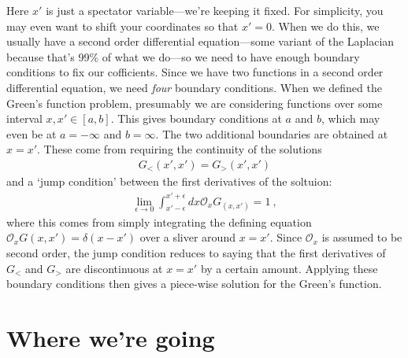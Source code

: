 Here $x'$ is just a spectator variable---we're keeping it fixed. For simplicity, you may even want to shift your coordinates so that $x'=0$. When we do this, we usually have a second order differential equation---some variant of the Laplacian because that's 99\% of what we do---so we need to have enough boundary conditions to fix our cofficients. Since we have two functions in a second order differential equation, we need \emph{four} boundary conditions. When we defined the Green's function problem, presumably we are considering functions over some interval $x,x'\in [a,b]$. This gives boundary conditions at $a$ and $b$, which may even be at $a=-\infty$ and $b=\infty$. The two additional boundaries are obtained at $x=x'$. These come from requiring the continuity of the solutions
\begin{align}
  G_<(x',x') = G_>(x',x')
\end{align}
and a `jump condition' between the first derivatives of the soltuion:
\begin{align}
  \lim_{\epsilon\to 0}\int_{x'-\epsilon}^{x'+\epsilon}dx \mathcal O_x G_(x,x') = 1 \ ,
\end{align}
where this comes from simply integrating the defining equation $\mathcal O_xG(x,x') = \delta(x-x')$ over a sliver around $x=x'$. Since $\mathcal O_x$ is assumed to be second order, the jump condition reduces to saying that the first derivatives of $G_<$ and $G_>$ are discontinuous at $x=x'$ by a certain amount. Applying these boundary conditions then gives a piece-wise solution for the Green's function.


\section{Where we're going}
\label{sec:ways:to:solve:G}

